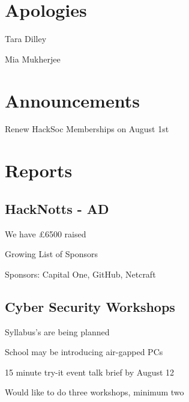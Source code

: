 \documentclass[11pt,hacksoc]{meetingmins}
\begin{document}
\maketitle

\section{Apologies}
\begin{items}
	\item Tara Dilley
	\item Mia Mukherjee
\end{items}

\section{Announcements}
\begin{items}
	\item Renew HackSoc Memberships on August 1st
\end{items}

\section{Reports}

\subsection{HackNotts - AD}
\begin{hiddensubitems}
	\item We have \pounds6500 raised
	\item Growing List of Sponsors
	\item Sponsors: Capital One, GitHub, Netcraft
\end{hiddensubitems}

\subsection{Cyber Security Workshops}
\begin{hiddensubitems}
	\item Syllabus's are being planned
	\item School may be introducing air-gapped PCs
	\item 15 minute try-it event talk brief by August 12
	\item Would like to do three workshops, minimum two
\end{hiddensubitems}
\end{document}
